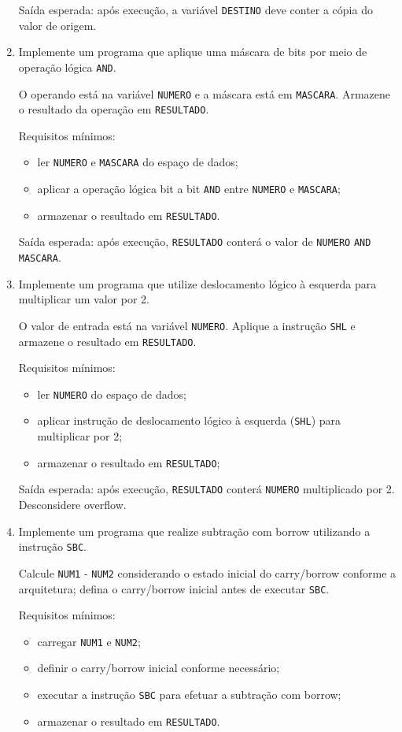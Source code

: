 \documentclass[12pt,a4paper]{article}
\begin{document}
\begin{enumerate}[left=0pt,label=\textbf{Exercício \arabic*:},itemsep=8pt]
Saída esperada: após execução, a variável \texttt{DESTINO} deve conter a cópia do valor de origem.

\item Implemente um programa que aplique uma máscara de bits por meio de operação lógica \texttt{AND}.

O operando está na variável \texttt{NUMERO} e a máscara está em \texttt{MASCARA}. Armazene o resultado da operação em \texttt{RESULTADO}.

Requisitos mínimos:
\begin{itemize}
	\item ler \texttt{NUMERO} e \texttt{MASCARA} do espaço de dados;
	\item aplicar a operação lógica bit a bit \texttt{AND} entre \texttt{NUMERO} e \texttt{MASCARA};
	\item armazenar o resultado em \texttt{RESULTADO}.
\end{itemize}

Saída esperada: após execução, \texttt{RESULTADO} conterá o valor de \texttt{NUMERO} \texttt{AND} \texttt{MASCARA}.

\item Implemente um programa que utilize deslocamento lógico à esquerda para multiplicar um valor por 2.

O valor de entrada está na variável \texttt{NUMERO}. Aplique a instrução \texttt{SHL} e armazene o resultado em \texttt{RESULTADO}.

Requisitos mínimos:
\begin{itemize}
	\item ler \texttt{NUMERO} do espaço de dados;
	\item aplicar instrução de deslocamento lógico à esquerda (\texttt{SHL}) para multiplicar por 2;
	\item armazenar o resultado em \texttt{RESULTADO};
\end{itemize}

Saída esperada: após execução, \texttt{RESULTADO} conterá \texttt{NUMERO} multiplicado por 2. Desconsidere overflow.

\item Implemente um programa que realize subtração com borrow utilizando a instrução \texttt{SBC}.

Calcule \texttt{NUM1} - \texttt{NUM2} considerando o estado inicial do carry/borrow conforme a arquitetura; defina o carry/borrow inicial antes de executar \texttt{SBC}.

Requisitos mínimos:
\begin{itemize}
	\item carregar \texttt{NUM1} e \texttt{NUM2};
	\item definir o carry/borrow inicial conforme necessário;
	\item executar a instrução \texttt{SBC} para efetuar a subtração com borrow;
	\item armazenar o resultado em \texttt{RESULTADO}.
\end{itemize}


\end{enumerate}
\end{document}
